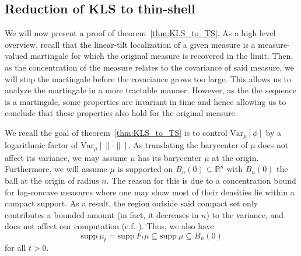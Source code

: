 \subsection{Reduction of KLS to thin-shell}\label{sec:KLS_to_TS}

We will now present a proof of theorem~\ref{thm:KLS_to_TS}.
As a high level overview, recall that the linear-tilt localization of a given measure is a measure-valued martingale
for which the original measure is recovered in the limit. Then, as the concentration of the measure 
relates to the covariance of said measure, we will stop the martingale before the covariance grows too large. 
This allows us to analyze the martingale in a more tractable manner. However, as the the sequence is 
a martingale, some properties are invariant in time and hence allowing us to conclude that these properties 
also hold for the original measure.

We recall the goal of theorem~\ref{thm:KLS_to_TS} is to control \(\text{Var}_\mu[\phi]\) by 
a logarithmic factor of \(\text{Var}_\mu[\|\cdot\|]\). As translating the barycenter of \(\mu\)
does not affect its variance, we may assume \(\mu\) has its barycenter \(\overline{\mu}\) at the origin.
Furthermore, we will assume \(\mu\) is supported on \(B_n(0) \subseteq \mathbb{R}^n\) with 
\(B_n(0)\) the ball at the origin of radius \(n\). The reason for this is due to a concentration 
bound for log-concave measures where one may show most of their densities lie within a compact support.
As a result, the region outside said compact set only contributes a bounded amount (in fact, it decreases 
in \(n\)) to the variance, and does not affect our computation (c.f. \cite{Klartag_2006}). 
Thus, we also have 
\[\text{supp}\ \mu_t = \text{supp}\ F_t\mu \subseteq \text{supp}\ \mu \subseteq B_n(0)\] 
for all \(t > 0\).
 
